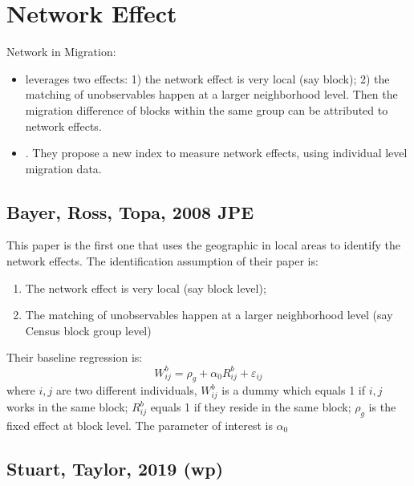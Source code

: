 \chapter{Network Effect}
\label{cha:network_effect}

Network in Migration:
\begin{itemize}
    \item \citet{BayerRossTopa2008} leverages two effects: 1) the network effect is very local (say block); 2) the matching of unobservables happen at a larger neighborhood level. Then the migration difference of blocks within the same group can be attributed to network effects.
    \item \citet{StuartTaylor2019,StuartTaylor2019a}. They propose a new index to measure network effects, using individual level migration data.
\end{itemize}

\section{Bayer, Ross, Topa, 2008 JPE} %
\label{sec:bayer_ross_topa_2008_jpe}

\textbf{}

This paper is the first one that uses the geographic in local areas to identify the network effects.
The identification assumption of their paper is:
\begin{enumerate}
    \item The network effect is very local (say block level);
    \item The matching of unobservables happen at a larger neighborhood level (say Census block group level)
\end{enumerate}

Their baseline regression is:
\[
    W_{i j}^{b}=\rho_{g}+\alpha_{0} R_{i j}^{b}+\varepsilon_{i j}
\]
where $i,j$ are two different individuals, $W_{ij}^b$ is a dummy which equals 1 if $i,j$ works in the same block; 
$R_{ij}^b$ equals 1 if they reside in the same block; 
$\rho_g$ is the fixed effect at block level.
The parameter of interest is $\alpha_0$ 




\section{Stuart, Taylor, 2019 (wp)} %
\label{sec:stuart_taylor_2019_wp}

